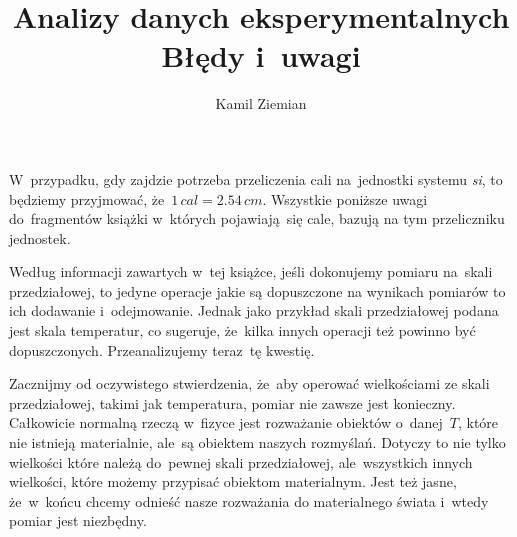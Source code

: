 \documentclass[a4paper,11pt]{article}
\title{Analizy danych eksperymentalnych \\
  {\Large Błędy i~uwagi}}
\author{Kamil Ziemian}
\begin{document}





\maketitle %






\vspace{0em}



\vspace{0em}


\noindent
W~przypadku, gdy zajdzie potrzeba przeliczenia cali na~jednostki systemu
\textit{si}, to będziemy przyjmować, że~$1 \, \si{cal} = 2.54 \, \si{cm}$.
Wszystkie poniższe uwagi do~fragmentów książki w~których pojawiają~się cale,
bazują na tym przeliczniku jednostek.

\vspace{\VerSpaceFour}






\vspace{0em}


\noindent
{} Według informacji zawartych w~tej książce, jeśli dokonujemy pomiaru
na~skali przedziałowej, to jedyne operacje jakie są dopuszczone na wynikach
pomiarów to ich dodawanie i~odejmowanie. Jednak jako przykład skali
przedziałowej podana jest skala temperatur, co sugeruje, że~kilka innych
operacji też powinno być dopuszczonych. Przeanalizujemy teraz~tę kwestię.

Zacznijmy od oczywistego stwierdzenia, że~aby operować wielkościami ze skali
przedziałowej, takimi jak temperatura, pomiar nie zawsze jest konieczny.
Całkowicie normalną rzeczą w~fizyce jest rozważanie obiektów o~danej~$T$,
które nie istnieją materialnie, ale~są obiektem naszych rozmyślań. Dotyczy
to nie tylko wielkości które należą do~pewnej skali przedziałowej,
ale~wszystkich innych wielkości, które możemy przypisać obiektom materialnym.
Jest też jasne, że~w~końcu chcemy odnieść nasze rozważania do materialnego
świata i~wtedy pomiar jest niezbędny.
\end{document}
